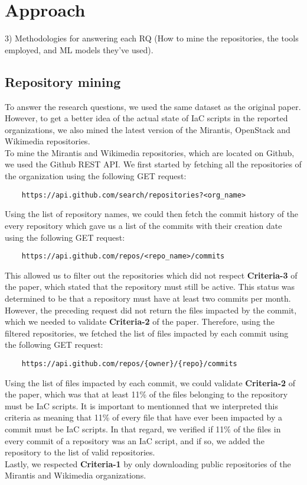 
\section{Approach}
\label{sec:approach}
3) Methodologies for answering each RQ (How to mine the repositories, the tools employed, and ML models they've used).
\subsection{Repository mining}
To answer the research questions, we used the same dataset as the original paper. However, to get a better idea of the actual state of IaC scripts in the reported organizations, we also mined the latest version of the Mirantis, OpenStack and Wikimedia repositories. \\
To mine the Mirantis and Wikimedia repositories, which are located on Github, we used the Github REST API. We first started by fetching all the repositories of the organization using the following GET request:

\begin{verbatim}
    https://api.github.com/search/repositories?<org_name>
\end{verbatim}

Using the list of repository names, we could then fetch the commit history of the every repository which gave us a list of the commits with their creation date using the following GET request:

\begin{verbatim}
    https://api.github.com/repos/<repo_name>/commits
\end{verbatim}

This allowed us to filter out the repositories which did not respect \textbf{Criteria-3} of the paper, which stated that the repository must still be active. This status was determined to be that a repository must have at least two commits per month. \\
However, the preceding request did not return the files impacted by the commit, which we needed to validate \textbf{Criteria-2} of the paper. Therefore, using the filtered repositories, we fetched the list of files impacted by each commit using the following GET request:

\begin{verbatim}
    https://api.github.com/repos/{owner}/{repo}/commits
\end{verbatim}

Using the list of files impacted by each commit, we could validate \textbf{Criteria-2} of the paper, which was that at least 11\% of the files belonging to the repository must be IaC scripts. It is important to mentionned that we interpreted this criteria as meaning that 11\% of every file that have ever been impacted by a commit must be IaC scripts. In that regard, we verified if 11\% of the files in every commit of a repository was an IaC script, and if so, we added the repository to the list of valid repositories. \\
Lastly, we respected \textbf{Criteria-1} by only downloading public repositories of the Mirantis and Wikimedia organizations. \\

